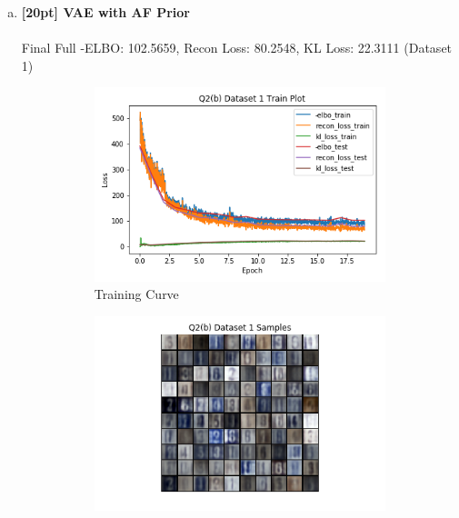 \documentclass{article}
\begin{document}
\begin{enumerate}[(a)]
        \newpage

        \item {\bf [20pt] VAE with AF Prior} \\\\
        Final Full -ELBO: 102.5659, Recon Loss: 80.2548, KL Loss: 22.3111 (Dataset 1)
        \begin{figure}[H]
               \centering
               \begin{subfigure}[b]{0.475\textwidth}
                   \centering
                   \includegraphics[width=\textwidth]{figures/q2_b_dset1_train_plot.png}
                   \caption{Training Curve}
               \end{subfigure}
               \hfill
               \begin{subfigure}[b]{0.475\textwidth}
                   \centering
                   \includegraphics[width=\textwidth]{figures/q2_b_dset1_samples.png}

\end{subfigure}
\end{figure}
\end{enumerate}
\end{document}
